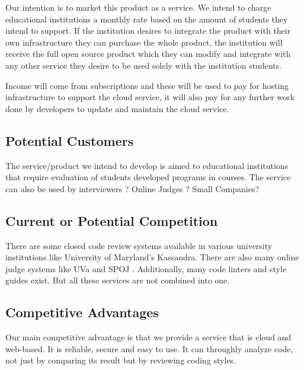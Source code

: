 
Our intention is to market this product as a service. We intend to charge
educational institutions a monthly rate based on the amount of students they
intend to support. If the institution desires to integrate the product with
their own infrastructure they can purchase the whole product, the institution
will receive the full open source product which they can modify and integrate
with any other service they desire to be used solely with the institution
students.

Income will come from subscriptions and these will be used to pay for hosting
infrastructure to support the cloud service, it will also pay for any further
work done by developers to update and maintain the cloud service.

\subsection{Potential Customers}

The service/product we intend to develop is aimed to educational institutions
that require evaluation of students developed programs in courses. The service
can also be used by interviewers ? Online Judges ? Small Companies?

\subsection{Current or Potential Competition}

There are some closed code review systems available in various university
institutions like \cite{Matt1994} University of Maryland's Kassandra. There are
also many online judge systems like UVa \cite{UVA} and SPOJ \cite{SPOJ}.
Additionally, many code linters and style guides exist. But all these services
are not combined into one.

\subsection{Competitive Advantages}

Our main competitive advantage is that we provide a service that is cloud and
web-based. It is reliable, secure and easy to use. It can throughly analyze
code, not just by comparing its result but by reviewing coding styles.




